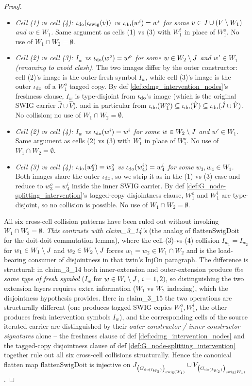 \documentclass[main]{subfiles}
\providecommand{\flattenSwigDoit}{\mathrm{flattenSwigDoit}}
\begin{document}
\begin{proof}
\begin{itemize}
    \item \emph{Cell (1) vs cell (4): $\iota_{\operatorname{do}}(\iota_{\mathrm{swig}}(v))$ vs $\iota_{\operatorname{do}}(w^i) = w^i$ for some $v \in J \cup (V \setminus W_1)$ and $w \in W_1$.} Same argument as cells (1) vs (3) with $W_1^i$ in place of $W_1^o$. No use of $W_1 \cap W_2 = \emptyset$.
    \item \emph{Cell (2) vs cell (3): $I_w$ vs $\iota_{\operatorname{do}}(w^o) = w^o$ for some $w \in W_2 \setminus J$ and $w' \in W_1$ (renaming to avoid clash).} The two images differ by the outer constructor: cell (2)'s image is the outer fresh symbol $I_w$, while cell (3)'s image is the outer $\iota_{\operatorname{do}}$ of a $W_1^o$ tagged copy. By def \ref{def:cdmg_intervention_nodes}'s freshness clause, $I_w$ is type-disjoint from $\iota_{\operatorname{do}}$'s image (which is the original SWIG carrier $\hat J \cup \hat V$), and in particular from $\iota_{\operatorname{do}}(W_1^o) \subseteq \iota_{\operatorname{do}}(\hat V) \subseteq \iota_{\operatorname{do}}(\hat J \cup \hat V)$. No collision; no use of $W_1 \cap W_2 = \emptyset$.
    \item \emph{Cell (2) vs cell (4): $I_w$ vs $\iota_{\operatorname{do}}(w^i) = w^i$ for some $w \in W_2 \setminus J$ and $w' \in W_1$.} Same argument as cells (2) vs (3) with $W_1^i$ in place of $W_1^o$. No use of $W_1 \cap W_2 = \emptyset$.
    \item \emph{Cell (3) vs cell (4): $\iota_{\operatorname{do}}(w_3^o) = w_3^o$ vs $\iota_{\operatorname{do}}(w_4^i) = w_4^i$ for some $w_3, w_4 \in W_1$.} Both images share the outer $\iota_{\operatorname{do}}$, so we strip it as in the (1)-vs-(3) case and reduce to $w_3^o = w_4^i$ inside the inner SWIG carrier. By def \ref{def:G_node-splitting_intervention}'s tagged-copy disjointness clause, $W_1^o$ and $W_1^i$ are type-disjoint, so no collision is possible. No use of $W_1 \cap W_2 = \emptyset$.
\end{itemize}
All six cross-cell collision patterns have been ruled out without invoking $W_1 \cap W_2 = \emptyset$. \emph{This contrasts with claim_3_14's \flattenIntExt} (the analog of $\flattenSwigDoit$ for the doit-doit commutation lemma), where the cell-(3)-vs-(4) collision $I_{w_1} = I_{w_2}$ for $w_1 \in W_1 \setminus J$ and $w_2 \in W_2 \setminus J$ forces $w_1 = w_2 \in W_1 \cap W_2$ and is the load-bearing consumer of disjointness in that twin's InjOn paragraph. The difference is structural: in claim_3_14 both inner-extension and outer-extension produce \emph{the same type of fresh symbol} ($I_w$ for $w \in W_i \setminus J$, $i = 1, 2$), so distinguishing the two extension layers requires extra information ($W_1$ vs $W_2$ indexing), which the disjointness hypothesis provides. Here in claim_3_15 the two operations are structurally different (one produces tagged SWIG copies $W_1^o, W_1^i$, the other produces fresh intervention symbols $I_w$), and the corresponding cells of the source iterated carrier are distinguished by their \emph{outer-constructor / inner-constructor signatures} alone -- the freshness clause of def \ref{def:cdmg_intervention_nodes} and the tagged-copy disjointness clause of def \ref{def:G_node-splitting_intervention} together rule out all six cross-cell collisions structurally. Hence the canonical flatten map $\flattenSwigDoit$ is injective on $J_{\left ( G_{\operatorname{do}(I_{W_2})} \right )_{\mathrm{swig}(W_1)}} \cup V_{\left ( G_{\operatorname{do}(I_{W_2})} \right )_{\mathrm{swig}(W_1)}}$. \checkmark


\end{proof}
\end{document}
